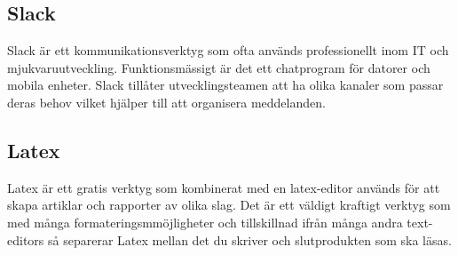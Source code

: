 \subsection*{Slack}
Slack är ett kommunikationsverktyg som ofta används professionellt inom IT och mjukvaruutveckling. Funktionsmässigt är det ett chatprogram för datorer och mobila enheter. Slack tillåter utvecklingsteamen att ha olika kanaler som passar deras behov vilket hjälper till att organisera meddelanden\cite{Slack}.

\subsection*{Latex}
Latex är ett gratis verktyg som kombinerat med en latex-editor används för att skapa artiklar och rapporter av olika slag. Det är ett väldigt kraftigt verktyg som med många formateringsmmöjligheter och tillskillnad ifrån många andra text-editors så separerar Latex mellan det du skriver och slutprodukten som ska läsas.

